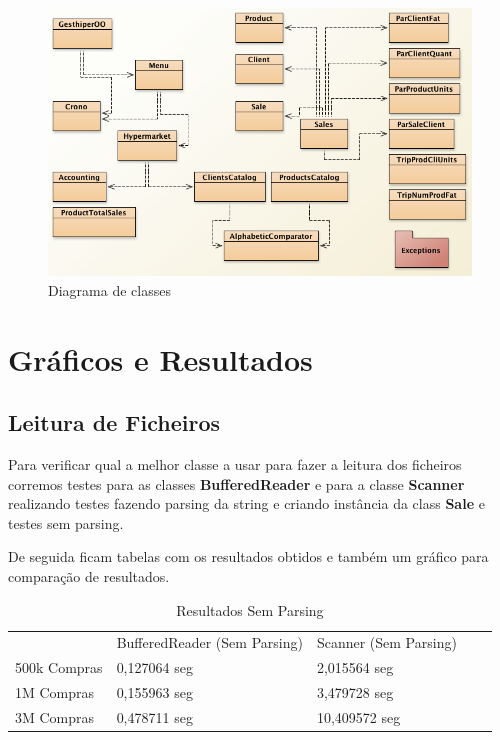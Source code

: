 \documentclass[10pt] {article}
\begin{document}
\begin{figure}[ht!]
\centering
\includegraphics[width=150mm]{diagram.png}
\caption{Diagrama de classes}
\label{fig:sales}
\end{figure}

\newpage
\section{Gráficos e Resultados}
\subsection{Leitura de Ficheiros}

\par Para verificar qual a melhor classe a usar para fazer a leitura dos ficheiros corremos testes para as classes
\color{blue} \textbf{BufferedReader} \color{black} e para a classe\color{blue} \textbf{Scanner} \color{black} realizando testes 
fazendo parsing da string e criando instância da class \color{blue} \textbf{Sale} \color{black} e testes sem parsing.
\par De seguida ficam tabelas com os resultados obtidos e também um gráfico para comparação de resultados.

\begin{table}[h]
\centering
\caption{Resultados Sem Parsing}
\label{my-label}
\begin{tabular}{l|l|l|ll}
\cline{2-3}
                                   & BufferedReader (Sem Parsing) & Scanner (Sem Parsing) &  &  \\ \cline{1-3}
\multicolumn{1}{|l|}{500k Compras} & 0,127064 seg                 & 2,015564 seg          &  &  \\ \cline{1-3}
\multicolumn{1}{|l|}{1M Compras}   & 0,155963 seg                 & 3,479728 seg          &  &  \\ \cline{1-3}
\multicolumn{1}{|l|}{3M Compras}   & 0,478711 seg                 & 10,409572 seg         &  &  \\ \cline{1-3}
\end{tabular}
\end{table}
\end{document}
